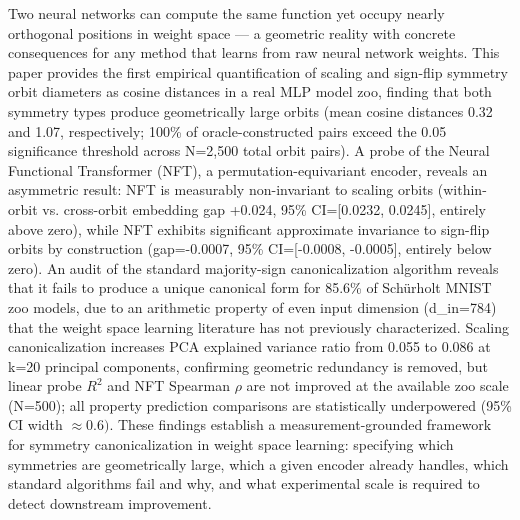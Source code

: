 
Two neural networks can compute the same function yet occupy nearly orthogonal positions in weight space --- a geometric reality with concrete consequences for any method that learns from raw neural network weights. This paper provides the first empirical quantification of scaling and sign-flip symmetry orbit diameters as cosine distances in a real MLP model zoo, finding that both symmetry types produce geometrically large orbits (mean cosine distances 0.32 and 1.07, respectively; 100\% of oracle-constructed pairs exceed the 0.05 significance threshold across N=2,500 total orbit pairs). A probe of the Neural Functional Transformer (NFT), a permutation-equivariant encoder, reveals an asymmetric result: NFT is measurably non-invariant to scaling orbits (within-orbit vs. cross-orbit embedding gap +0.024, 95\% CI=[0.0232, 0.0245], entirely above zero), while NFT exhibits significant approximate invariance to sign-flip orbits by construction (gap=-0.0007, 95\% CI=[-0.0008, -0.0005], entirely below zero). An audit of the standard majority-sign canonicalization algorithm reveals that it fails to produce a unique canonical form for 85.6\% of Schürholt MNIST zoo models, due to an arithmetic property of even input dimension (d\_in=784) that the weight space learning literature has not previously characterized. Scaling canonicalization increases PCA explained variance ratio from 0.055 to 0.086 at k=20 principal components, confirming geometric redundancy is removed, but linear probe $R^2$ and NFT Spearman $\rho$ are not improved at the available zoo scale (N=500); all property prediction comparisons are statistically underpowered (95\% CI width $\approx 0.6)$. These findings establish a measurement-grounded framework for symmetry canonicalization in weight space learning: specifying which symmetries are geometrically large, which a given encoder already handles, which standard algorithms fail and why, and what experimental scale is required to detect downstream improvement.


